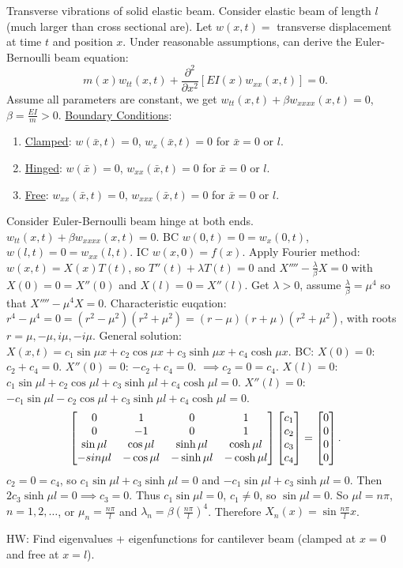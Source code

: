 \documentclass[]{article}
\begin{document}
\newpage

Transverse vibrations of solid elastic beam.
Consider elastic beam of length $l$ (much larger than cross sectional are). Let $w(x,t) = $ transverse displacement at time $t$ and position $x$. Under reasonable assumptions, can derive the Euler-Bernoulli beam equation: $$ m(x) w_{tt}(x,t) + \frac{\partial^2}{\partial x^2} [EI(x)w_{xx}(x,t)] = 0. $$
Assume all parameters are constant, we get $ w_{tt}(x,t) + \beta w_{xxxx} (x,t) = 0$, $\beta = \frac{EI}{m} > 0$.
\underline{Boundary Conditions}: 
\begin{enumerate}
	\item[]\underline{Clamped}: $w(\bar{x},t) = 0$, $w_x(\bar{x},t) = 0$ for $\bar{x} = 0$ or $l$.
	\item[]\underline{Hinged}: $w(\bar{x}) = 0$, $w_{xx}(\bar{x},t) = 0$ for $\bar{x} = 0$ or $l$.
	\item[]\underline{Free}: $w_{xx}(\bar{x},t) = 0$, $w_{xxx}(\bar{x},t) = 0$ for $\bar{x} = 0$ or $l$.
\end{enumerate}
\begin{example}
	Consider Euler-Bernoulli beam hinge at both ends. $w_{tt}(x,t) + \beta w_{xxxx} (x,t) = 0$. BC $w(0,t) = 0 = w_x(0,t)$, $w(l,t) = 0 = w_{xx}(l,t)$. IC $w(x,0) = f(x)$.
	Apply Fourier method: $w(x,t) = X(x) T(t)$, so $T''(t) + \lambda T(t) = 0$ and $X'''' - \frac{\lambda}{\beta} X = 0$ with $X(0) = 0 = X''(0)$ and $X(l) = 0 = X''(l)$. Get $\lambda>0$, assume $\frac{\lambda}{\beta} = \mu^4$ so that $X'''' - \mu^4 X = 0$. Characteristic euqation: $r^4 - \mu^4 = 0 = (r^2 - \mu^2)(r^2+\mu^2) = (r-\mu)(r+\mu)(r^2+\mu^2)$, with roots $r=\mu,-\mu,i\mu,-i\mu$.
	General solution: $X(x,t) = c_1 \sin{\mu x} + c_2\cos{\mu x} + c_3 \sinh{\mu x} + c_4 \cosh{\mu x}$. BC: $X(0) = 0$: $c_2 + c_4 = 0$. $X''(0) = 0$: $-c_2+c_4 = 0$. $\implies c_2 = 0 = c_4$. $X(l) = 0$: $c_1\sin{\mu l} + c_2 \cos{\mu l} + c_3 \sinh{\mu l} + c_4 \cosh{\mu l} = 0$. $X''(l) = 0$: $-c_1\sin{\mu l} - c_2 \cos{\mu l} + c_3 \sinh{\mu l} + c_4 \cosh{\mu l} = 0$.
	$$\begin{bmatrix} 0 & 1 & 0 & 1 \\ 0 & -1 & 0 & 1 \\ \sin{\mu l} & \cos{\mu l} & \sinh{\mu l} & \cosh{\mu l} \\ -sin{\mu l} & -\cos{\mu l} & -\sinh{\mu l} & -\cosh{\mu l}\end{bmatrix} \begin{bmatrix} c_1 \\ c_2 \\ c_3 \\ c_4\end{bmatrix} = \begin{bmatrix}0\\0\\0\\0\end{bmatrix}. $$
	$c_2 = 0 = c_4$, so $c_1 \sin{\mu l} + c_3 \sinh{\mu l} = 0$ and $-c_1 \sin{\mu l} + c_3 \sinh{\mu l} = 0$. Then $2c_3 \sinh{\mu l} = 0 \implies c_3 = 0$. Thus $c_1\sin{\mu l} = 0$, $c_1 \neq 0$, so $\sin{\mu l} = 0$. So $\mu l = n\pi$, $n = 1,2,\dots$, or $\mu_n = \frac{n\pi}{l}$ and $\lambda_n = \beta \left(\frac{n\pi}{l}\right)^4$. Therefore $X_n(x) = \sin{\frac{n\pi}{l}x}$.
\end{example}
HW: Find eigenvalues + eigenfunctions for cantilever beam (clamped at $x=0$ and free at $x=l$).
\end{document}
